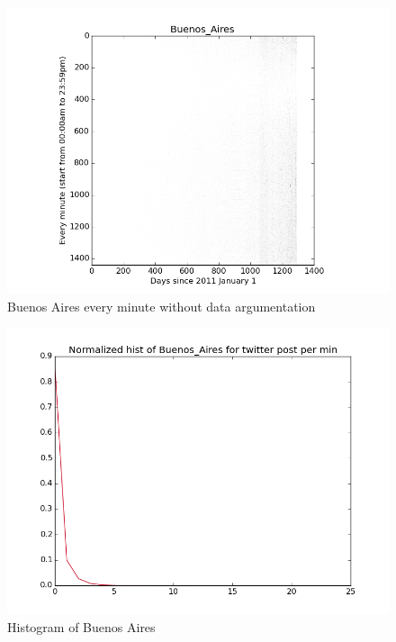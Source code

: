 \documentclass[a4paper,12pt]{article}
\begin{document}
\begin{figure}[H]
  \begin{center}
      \includegraphics[scale=0.8]{Buenos_Aires.png}
\end{center}
\caption{Buenos Aires every minute without data argumentation}
 \label {fig:2}
 \end{figure}



\begin{figure}[H]
  \begin{center}
      \includegraphics[scale=0.8]{Buenos_Aireshisto.png}
\end{center}
\caption{Histogram of Buenos Aires}
 \label {fig:2}
 \end{figure}
\end{document}
